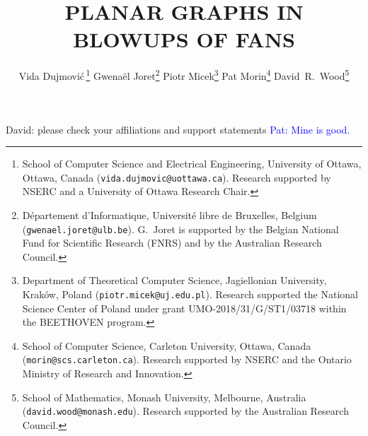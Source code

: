 \documentclass{patmorin}
\title{\MakeUppercase{\boldmath Planar graphs in blowups of fans}}
\author{
 Vida Dujmovi{\'c}\,\footnote{School of Computer Science and Electrical Engineering, University of Ottawa, Ottawa, Canada (\texttt{vida.dujmovic@uottawa.ca}). Research supported by NSERC and a University of Ottawa Research Chair.}
 \qquad
 Gwena\"el Joret\footnote{D\'epartement d'Informatique, Universit\'e libre de Bruxelles, Belgium ({\tt gwenael.joret@ulb.be}). G.\ Joret is supported by the Belgian National Fund for Scientific Research (FNRS) and by the Australian Research Council.}
 \qquad
 Piotr Micek\footnote{Department of Theoretical Computer Science, Jagiellonian University, Kraków, Poland (\texttt{piotr.micek@uj.edu.pl}). Research supported
 the National Science Center of Poland under grant UMO-2018/31/G/ST1/03718 within the BEETHOVEN program.}
 \qquad
 Pat Morin\footnote{School of Computer Science, Carleton University, Ottawa, Canada (\texttt{morin@scs.carleton.ca}). Research supported by NSERC and the Ontario Ministry of Research and Innovation.}
 \qquad
 David~R.~Wood\footnote{School of Mathematics, Monash University, Melbourne, Australia (\texttt{david.wood@monash.edu}). Research supported by the Australian Research Council.}
 }
\date{}
\newcommand{\david}[1]{{\color{orange} David: #1}}
\newcommand{\pat}[1]{\textcolor{Blue}{Pat: #1}}
\newcommand{\gwen}[1]{\textcolor{Purple}{Gwen: #1}}
\begin{document}
\maketitle

%
%
%

\david{please check your affiliations and support statements} \pat{Mine is good.}
\end{document}
